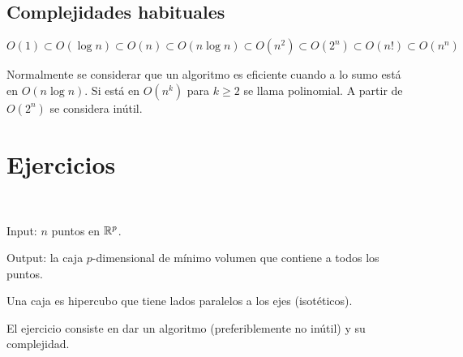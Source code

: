 \documentclass[AL.tex]{subfiles}
\begin{document}
\subsection{Complejidades habituales}

$O(1)\subset O(\log n)\subset O(n)\subset O(n\log n)\subset O(n^2)\subset O(2^n)\subset O(n!)\subset O(n^n)$

Normalmente se considerar que un algoritmo es eficiente cuando a lo sumo está en $O(n\log n)$. Si está en $O(n^k)$ para $k\geq 2$ se llama polinomial. A partir de $O(2^n)$ se considera inútil.


\section{Ejercicios}

\begin{ejer}\

Input: $n$ puntos en $\mathbb{R}^p$. 

Output: la caja $p$-dimensional de mínimo volumen que contiene a todos los puntos. 

Una caja es hipercubo que tiene lados paralelos a los ejes (isotéticos). 

El ejercicio consiste en dar un algoritmo (preferiblemente no inútil) y su complejidad.

\end{ejer}
\end{document}
